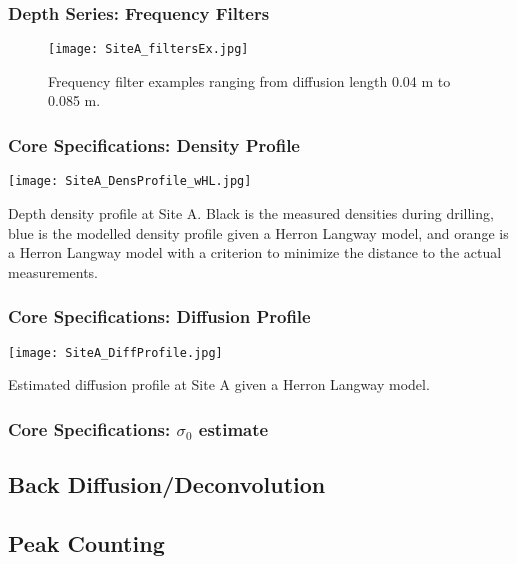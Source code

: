 \documentclass[../../CompleteThesis/Complete_1stDraft.tex]{subfiles}
\begin{document}
\subsubsection[Frequency Filters]{Depth Series: Frequency Filters}
\begin{figure}[h]
	\centering
	\texttt{[image: SiteA\_filtersEx.jpg]}
	\caption[Frequency filters example, Site A]{Frequency filter examples ranging from diffusion length 0.04 m to 0.085 m.}
	\label{fig:SiteA_filtersEx}
\end{figure}

\subsubsection[Density Profile]{Core Specifications: Density Profile}
\begin{marginfigure}
	\centering
	\texttt{[image: SiteA\_DensProfile\_wHL.jpg]}
	\caption[Density profile Site A]{\footnotesize{Depth density profile at Site A. Black is the measured densities during drilling, blue is the modelled density profile given a Herron Langway model, and orange is a Herron Langway model with a criterion to minimize the distance to the actual measurements.}}
	\label{Fig:SiteA_DensProfile_wHL}
\end{marginfigure}


\subsubsection[Diffusion Profile]{Core Specifications: Diffusion Profile}
\begin{marginfigure}
	\centering
	\texttt{[image: SiteA\_DiffProfile.jpg]}
	\caption[Diffusion profile, Site A.]{\footnotesize{Estimated diffusion profile at Site A given a Herron Langway model.}}
	\label{fig:SiteADiffProfile}
\end{marginfigure}

\subsubsection[$\sigma_0$ estimate]{Core Specifications: $\sigma_0$ estimate}

\subsection[Back Diffusion]{Back Diffusion/Deconvolution}

\subsection[Peak Counting]{Peak Counting}
\end{document}

